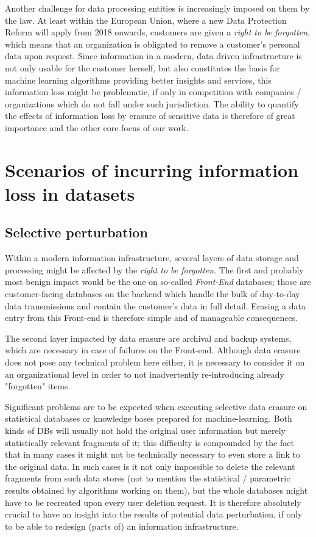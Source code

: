 \documentclass{llncs}
\begin{document}
Another challenge for data processing entities is increasingly imposed on them by the law. At least within the European Union, where a new Data Protection Reform will apply from 2018 onwards, customers are given a \textit{right to be forgotten}, which means that an organization is obligated to remove a customer's personal data upon request. Since information in a modern, data driven infrastructure is not only usable for the customer herself, but also constitutes the basis for machine learning algorithms providing better insights and services, this information loss might be problematic, if only in competition with companies / organizations which do not fall under such jurisdiction. The ability to quantify the effects of information loss by erasure of sensitive data is therefore of great importance and the other core focus of our work.


\section{Scenarios of incurring information loss in datasets}


\subsection{Selective perturbation}

Within a modern information infrastructure, several layers of data storage and processing might be affected by the \textit{right to be forgotten}. The first and probably most benign impact would be the one on so-called \textit{Front-End} databases; those are customer-facing databases on the backend which handle the bulk of day-to-day data transmissions and contain the customer's data in full detail. Erasing a data entry from this Front-end is therefore simple and of manageable consequences. 

The second layer impacted by data erasure are archival and backup systems, which are necessary in case of failures on the Front-end. Although data erasure does not pose any technical problem here either, it is necessary to consider it on an organizational level in order to not inadvertently re-introducing already "forgotten" items.

Significant problems are to be expected when executing selective data erasure on statistical databases or knowledge bases prepared for machine-learning. Both kinds of DBs will usually not hold the original user information but merely statistically relevant fragments of it; this difficulty is compounded by the fact that in many cases it might not be technically necessary to even store a link to the original data. In such cases is it not only impossible to delete the relevant fragments from such data stores (not to mention the statistical / parametric results obtained by algorithms working on them), but the whole databases might have to be recreated upon every user deletion request. It is therefore absolutely crucial to have an insight into the results of potential data perturbation, if only to be able to redesign (parts of) an information infrastructure.
\end{document}
